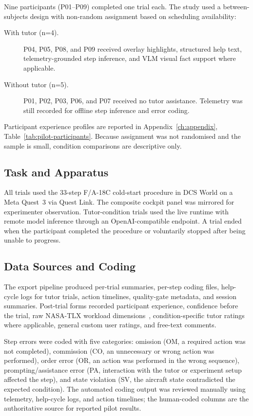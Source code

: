 Nine participants (P01--P09) completed one trial each. The study used a
between-subjects design with non-random assignment based on scheduling
availability:

\begin{description}
\item[With tutor (n=4).] P04, P05, P08, and P09 received overlay highlights,
structured help text, telemetry-grounded step inference, and VLM visual fact
support where applicable.
\item[Without tutor (n=5).] P01, P02, P03, P06, and P07 received no tutor
assistance. Telemetry was still recorded for offline step inference and error
coding.
\end{description}

Participant experience profiles are reported in Appendix~\ref{ch:appendix},
Table~\ref{tab:pilot-participants}. Because assignment was not randomised and
the sample is small, condition comparisons are descriptive only.

\subsection{Task and Apparatus}

All trials used the 33-step F/A-18C cold-start procedure in DCS World on a Meta
Quest~3 via Quest Link. The composite cockpit panel was mirrored for
experimenter observation. Tutor-condition trials used the live runtime with
remote model inference through an OpenAI-compatible endpoint. A trial ended
when the participant completed the procedure or voluntarily stopped after being
unable to progress.

\subsection{Data Sources and Coding}

The export pipeline produced per-trial summaries, per-step coding files,
help-cycle logs for tutor trials, action timelines, quality-gate metadata, and
session summaries. Post-trial forms recorded participant experience, confidence
before the trial, raw NASA-TLX workload dimensions~\citep{hart1988nasa},
condition-specific tutor ratings where applicable, general custom user
ratings, and free-text comments.

Step errors were coded with five categories: omission (OM, a required action
was not completed), commission (CO, an unnecessary or wrong action was
performed), order error (OR, an action was performed in the wrong sequence),
prompting/assistance error (PA, interaction with the tutor or experiment setup
affected the step), and state violation (SV, the aircraft state contradicted
the expected condition). The automated coding output was reviewed manually
using telemetry, help-cycle logs, and action timelines; the human-coded columns
are the authoritative source for reported pilot results.

